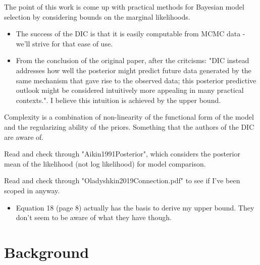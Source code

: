 \documentclass[10pt,a4paper]{article}
\begin{document}
The point of this work is come up with practical methods for Bayesian model selection by considering bounds on the marginal likelihoods. 
\begin{itemize}
\item The success of the DIC is that it is easily computable from MCMC data - we'll strive for that ease of use.
\item From the conclusion of the original paper, after the critcisms: "DIC instead addresses how well the posterior might predict future data generated by the same mechanism that gave rise to the observed data; this posterior predictive outlook might be considered intuitively more appealing in many practical contexts.". I believe this intuition is achieved by the upper bound.
\end{itemize}

Complexity is a combination of non-linearity of the functional form of the model and the regularizing ability of the priors. Something that the authors of the DIC are aware of. 

Read and check through "Aikin1991Posterior", which considers the posterior mean of the likelihood (not log likelihood) for model comparison.


Read and check through "Oladyshkin2019Connection.pdf" to see if I've been scoped in anyway.
\begin{itemize}
\item Equation 18 (page 8) actually has the basis to derive my upper bound. They don't seem to be aware of what they have though.
\end{itemize}
\section{Background}
\end{document}
